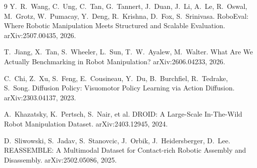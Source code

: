 \documentclass[10pt]{article}
\begin{document}
\begin{thebibliography}{9}
Y.~R.~Wang, C.~Ung, C.~Tan, G.~Tannert, J.~Duan, J.~Li, A.~Le, R.~Oswal,
M.~Grotz, W.~Pumacay, Y.~Deng, R.~Krishna, D.~Fox, S.~Srinivasa.
\newblock RoboEval: Where Robotic Manipulation Meets Structured and Scalable
Evaluation.
\newblock arXiv:2507.00435, 2026.

T.~Jiang, X.~Tan, S.~Wheeler, L.~Sun, T.~W.~Ayalew, M.~Walter.
\newblock What Are We Actually Benchmarking in Robot Manipulation?
\newblock arXiv:2606.04233, 2026.

C.~Chi, Z.~Xu, S.~Feng, E.~Cousineau, Y.~Du, B.~Burchfiel, R.~Tedrake,
S.~Song.
\newblock Diffusion Policy: Visuomotor Policy Learning via Action Diffusion.
\newblock arXiv:2303.04137, 2023.

A.~Khazatsky, K.~Pertsch, S.~Nair, et al.
\newblock DROID: A Large-Scale In-The-Wild Robot Manipulation Dataset.
\newblock arXiv:2403.12945, 2024.

D.~Sliwowski, S.~Jadav, S.~Stanovcic, J.~Orbik, J.~Heidersberger, D.~Lee.
\newblock REASSEMBLE: A Multimodal Dataset for Contact-rich Robotic Assembly
and Disassembly.
\newblock arXiv:2502.05086, 2025.
\end{thebibliography}
\end{document}
